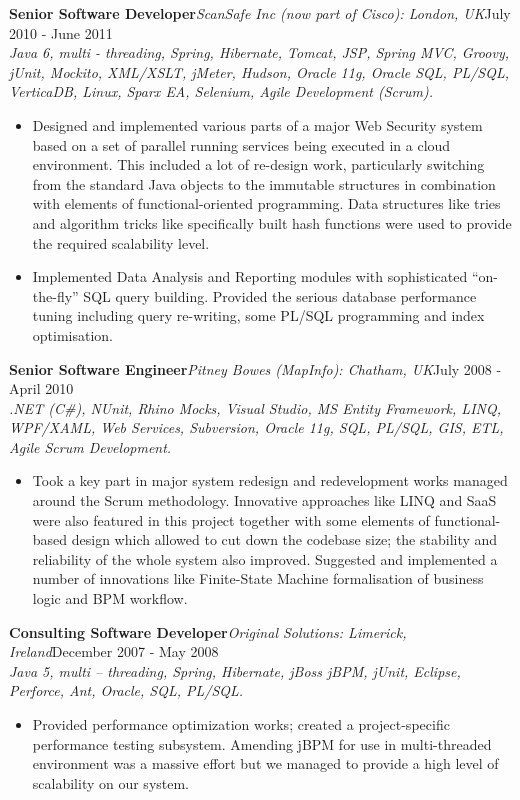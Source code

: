 \documentclass{res}
\newcommand{\jobdes}[4]{\needspace{3\baselineskip} %
{\noindent \bf #3\hspace{2ex}}{{\em \small #1}}{\hfill #2}\\{{\it \small #4.}}}
\begin{document}
\begin{resume}
\jobdes{ScanSafe Inc (now part of Cisco): London, UK}{July 2010 - June 2011}{Senior Software Developer}
{Java 6, multi - threading, Spring, Hibernate, Tomcat, JSP, Spring MVC, Groovy, jUnit, Mockito, XML/XSLT, jMeter, Hudson, Oracle 11g, Oracle SQL, PL/SQL, VerticaDB, Linux, Sparx EA, Selenium, Agile Development (Scrum)}
\begin{itemize} \itemsep -2pt %
 \item Designed and implemented various parts of a major Web Security system based on a set of parallel running services being executed in a cloud environment. This included a lot of re-design work, particularly switching from the standard Java objects to the immutable structures in combination with elements of functional-oriented programming. Data structures like tries and algorithm tricks like specifically built hash functions were used to provide the required scalability level.
 \item Implemented Data Analysis and Reporting modules with sophisticated “on-the-fly” SQL query building. Provided the serious database performance tuning including query re-writing, some PL/SQL programming and index optimisation.
\end{itemize}

\jobdes{Pitney Bowes (MapInfo): Chatham, UK}{July 2008 - April 2010}{Senior Software Engineer}
{.NET (C\#), NUnit, Rhino Mocks, Visual Studio, MS Entity Framework, LINQ, WPF/XAML, Web Services, Subversion, Oracle 11g, SQL, PL/SQL, GIS, ETL, Agile Scrum Development}
\begin{itemize} \itemsep -2pt %
 \item Took a key part in major system redesign and redevelopment works managed around the Scrum methodology. Innovative approaches like LINQ and SaaS were also featured in this project together with some elements of functional-based design which allowed to cut down the codebase size; the stability and reliability of the whole system also improved. Suggested and implemented a number of innovations like Finite-State Machine formalisation of business logic and BPM workflow.
\end{itemize}

\jobdes {Original Solutions: Limerick, Ireland}{December 2007 - May 2008}{Consulting Software Developer}
{Java 5, multi – threading, Spring, Hibernate, jBoss jBPM, jUnit, Eclipse, Perforce, Ant, Oracle, SQL, PL/SQL}
\begin{itemize} \itemsep -2pt %
 \item Provided performance optimization works; created a project-specific performance testing subsystem. Amending jBPM for use in multi-threaded environment was a massive effort but we managed to provide a high level of scalability on our system.
\end{itemize}


\end{resume}
\end{document}
